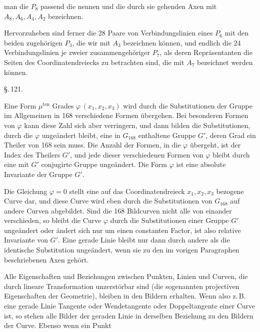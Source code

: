
man die $P_8$ passend die  nennen und die durch sie gehenden Axen mit $A_8, A_6, A_4, A_2$ bezeichnen.

Hervorzuheben sind ferner die 28 Paare von Verbindungslinien eines $P_6$ mit den beiden zugehörigen $P_3$, die wir mit $A_3$ bezeichnen können, und endlich die 24 Verbindungslinien je zweier zusammengehöriger $P_7$, als deren Repräsentanten die Seiten des Coordinatendreiecks zu betrachten sind, die mit $A_7$ bezeichnet werden können.

\begin{center}
\S.\,121.\\
\end{center}

Eine Form $\mu^{\mathrm{ten}}$ Grades $\varphi\,(x_1, x_2, x_3)$ wird durch die Substitutionen der Gruppe im Allgemeinen in 168 verschiedene Formen übergehen. Bei besonderen Formen von $\varphi$ kann diese Zahl sich aber verringern, und dann bilden die Substitutionen, durch die $\varphi$ ungeändert bleibt, eine in $G_{168}$ enthaltene Gruppe $G'$, deren Grad ein Theiler von 168 sein muss. Die Anzahl der Formen, in die $\varphi$ übergeht, ist der Index des Theilers $G'$, und jede dieser verschiedenen Formen von $\varphi$ bleibt durch eine mit $G'$ conjugirte Gruppe ungeändert. Die Form $\varphi$ ist eine absolute Invariante der Gruppe $G'$.

Die Gleichung $\varphi = 0$ stellt eine auf das Coordinatendreieck $x_1, x_2, x_3$ bezogene Curve dar, und diese Curve wird eben durch die Substitutionen von $G_{168}$ auf andere Curven abgebildet. Sind die 168 Bildcurven nicht alle von einander verschieden, so bleibt die Curve $\varphi$ durch die Substitutionen einer Gruppe $G'$ ungeändert oder ändert sich nur um einen constanten Factor, ist also relative Invariante von $G'$. Eine gerade Linie bleibt nur dann durch andere als die identische Substitution ungeändert, wenn sie zu den im vorigen Paragraphen beschriebenen Axen gehört.

Alle Eigenschaften und Beziehungen zwischen Punkten, Linien und Curven, die durch lineare Transformation unzerstörbar sind (die sogenannten projectiven Eigenschaften der Geometrie), bleiben in den Bildern erhalten. Wenn also z.\,B. eine gerade Linie Tangente oder Wendetangente oder Doppeltangente einer Curve ist, so stehen alle Bilder der geraden Linie in derselben Beziehung zu den Bildern der Curve. Ebenso wenn ein Punkt
